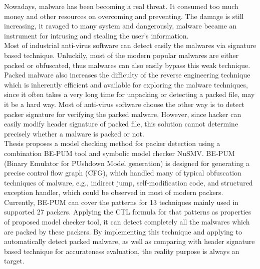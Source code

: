 \setlength\parindent{0pt}
\hspace{0.5cm}Nowadays, malware has been becoming a real threat. It consumed too much money and other resources on overcoming and preventing. The damage is still increasing, it ravaged to many system and dangerously, malware became an instrument for intrusing and stealing the user's information.\\

\hspace{0.5cm}Most of industrial anti-virus software can detect easily the malwares via signature based technique. Unluckily, most of the modern popular malwares are either packed or obfuscated, thus malwares can also easily bypass this weak technique. Packed malware also increases the difficulty of the reverse engineering technique which is inherently efficient and available for exploring the malware techniques, since it often takes a very long time for unpacking or detecting a packed file, may it be a hard way. Most of anti-virus software choose the other way is to detect packer signature for verifying the packed malware. However, since hacker can easily modify header signature of packed file, this solution cannot determine precisely whether a malware is packed or not.\\

\hspace{0.5cm}Thesis proposes a model checking method for packer detection using a combination BE-PUM tool and symbolic model checker NuSMV. BE-PUM (Binary Emulator for PUshdown Model generation) is designed for generating a precise control flow graph (CFG), which handled many of typical obfuscation techniques of malware, e.g., indirect jump, self-modification code, and structured exception handler, which could be observed in most of modern packers. Currently, BE-PUM can cover the patterns for 13 techniques mainly used in supported 27 packers. Applying the CTL formula for that patterns as properties of proposed model checker tool, it can detect completely all the malwares which are packed by these packers. By implementing this technique and applying to automatically detect packed malware, as well as comparing with header signature based technique for accurateness evaluation, the reality purpose is always an target.\\
